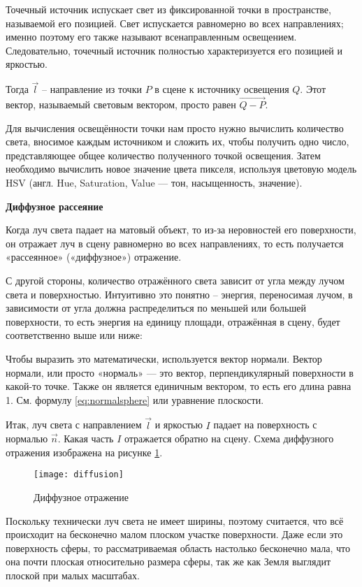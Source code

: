 Точечный источник испускает свет из фиксированной точки в пространстве, называемой его позицией. Свет испускается равномерно во всех направлениях; именно поэтому его также называют всенаправленным освещением. Следовательно, точечный источник полностью характеризуется его позицией и яркостью.

Тогда $\vec l$ -- направление из точки $P$ в сцене к источнику освещения $Q$. Этот вектор, называемый световым вектором, просто равен  $\overrightarrow{Q-P}$. 

Для вычисления освещённости точки нам просто нужно вычислить количество света, вносимое каждым источником и сложить их, чтобы получить одно число, представляющее общее количество полученного точкой освещения. Затем необходимо вычислить новое значение цвета пикселя, используя цветовую модель HSV (англ. Hue, Saturation, Value — тон, насыщенность, значение). 

\textbf{Диффузное рассеяние}

Когда луч света падает на матовый объект, то из-за неровностей его поверхности, он отражает луч в сцену равномерно во всех направлениях, то есть получается «рассеянное» («диффузное») отражение.

С другой стороны, количество отражённого света зависит от угла между лучом света и поверхностью. Интуитивно это понятно -- энергия, переносимая лучом, в зависимости от угла должна распределиться по меньшей или большей поверхности, то есть энергия на единицу площади, отражённая в сцену, будет соответственно выше или ниже:

Чтобы выразить это математически, используется вектор нормали. Вектор нормали, или просто «нормаль» — это вектор, перпендикулярный поверхности в какой-то точке. Также он является единичным вектором, то есть его длина равна 1. См. формулу \ref{eq:normalsphere} или уравнение плоскости. 

Итак, луч света с направлением $\vec l$ и яркостью $I$ падает на поверхность с нормалью $\vec n$. Какая часть $I$ отражается обратно на сцену. Схема диффузного отражения изображена на рисунке \ref{img:diffusion}. 

\begin{figure}[H]
	\centering
	\texttt{[image: diffusion]}
	\caption{Диффузное отражение}
	\label{img:diffusion}
\end{figure}

Поскольку технически луч света не имеет ширины, поэтому считается, что всё происходит на бесконечно малом плоском участке поверхности. Даже если это поверхность сферы, то рассматриваемая область настолько бесконечно мала, что она почти плоская относительно размера сферы, так же как Земля выглядит плоской при малых масштабах.

